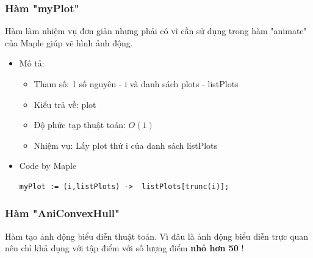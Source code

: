 \documentclass[12pt]{article}
\begin{document}
      \subsubsection{Hàm "myPlot"}
        Hàm làm nhiệm vụ đơn giản nhưng phải có vì cần sử dụng trong hàm "animate" của Maple giúp vẽ hình ảnh động.
        \begin{itemize}
          \item Mô tả:
          \begin{itemize}
            \item Tham số: 1 số nguyên - i và danh sách plots - listPlots
            \item Kiểu trả về: plot 
            \item Độ phức tạp thuật toán: $O(1)$
            \item Nhiệm vụ: Lấy plot thứ i của danh sách listPlots
          \end{itemize}
          \item Code by Maple
            \begin{Verbatim}[frame=single]
  myPlot := (i,listPlots) ->  listPlots[trunc(i)];
            \end{Verbatim}
        \end{itemize}
      \subsubsection{Hàm "AniConvexHull"}
        Hàm tạo ảnh động biểu diễn thuật toán. Vì đâu là ảnh động biểu diễn trực quan nên chỉ khả dụng với tập điểm với số lượng điểm \textbf{nhỏ hơn 50} !
        
\end{document}
